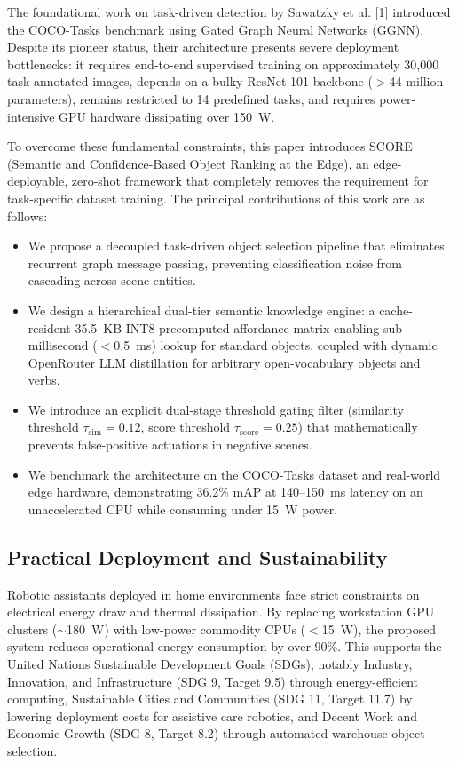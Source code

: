 \documentclass[conference]{IEEEtran}
\begin{document}
The foundational work on task-driven detection by Sawatzky et al. [1] introduced the COCO-Tasks benchmark using Gated Graph Neural Networks (GGNN). Despite its pioneer status, their architecture presents severe deployment bottlenecks: it requires end-to-end supervised training on approximately 30,000 task-annotated images, depends on a bulky ResNet-101 backbone ($>$44 million parameters), remains restricted to 14 predefined tasks, and requires power-intensive GPU hardware dissipating over 150~W.

To overcome these fundamental constraints, this paper introduces SCORE (Semantic and Confidence-Based Object Ranking at the Edge), an edge-deployable, zero-shot framework that completely removes the requirement for task-specific dataset training. The principal contributions of this work are as follows:
\begin{itemize}
    \item We propose a decoupled task-driven object selection pipeline that eliminates recurrent graph message passing, preventing classification noise from cascading across scene entities.
    \item We design a hierarchical dual-tier semantic knowledge engine: a cache-resident 35.5~KB INT8 precomputed affordance matrix enabling sub-millisecond ($<$0.5~ms) lookup for standard objects, coupled with dynamic OpenRouter LLM distillation for arbitrary open-vocabulary objects and verbs.
    \item We introduce an explicit dual-stage threshold gating filter (similarity threshold $\tau_{\text{sim}} = 0.12$, score threshold $\tau_{\text{score}} = 0.25$) that mathematically prevents false-positive actuations in negative scenes.
    \item We benchmark the architecture on the COCO-Tasks dataset and real-world edge hardware, demonstrating 36.2\% mAP at 140--150~ms latency on an unaccelerated CPU while consuming under 15~W power.
\end{itemize}

\subsection{Practical Deployment and Sustainability}
Robotic assistants deployed in home environments face strict constraints on electrical energy draw and thermal dissipation. By replacing workstation GPU clusters ($\sim$180~W) with low-power commodity CPUs ($<$15~W), the proposed system reduces operational energy consumption by over 90\%. This supports the United Nations Sustainable Development Goals (SDGs), notably Industry, Innovation, and Infrastructure (SDG 9, Target 9.5) through energy-efficient computing, Sustainable Cities and Communities (SDG 11, Target 11.7) by lowering deployment costs for assistive care robotics, and Decent Work and Economic Growth (SDG 8, Target 8.2) through automated warehouse object selection.
\end{document}
